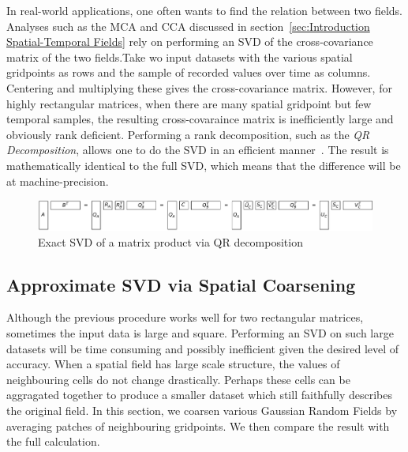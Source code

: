 \documentclass{acm_proc_article-sp}
\begin{document}
In real-world applications, one often wants to find the relation between two fields. Analyses such as the MCA and CCA discussed in section~\ref{sec:Introduction Spatial-Temporal Fields} rely on performing an SVD of the cross-covariance matrix of the two fields.Take wo input datasets with the various spatial gridpoints as rows and the sample of recorded values over time as columns. Centering and multiplying these gives the cross-covariance matrix. However, for highly rectangular matrices, when there are many spatial gridpoint but few temporal samples, the resulting cross-covaraince matrix is inefficiently large and obviously rank deficient. Performing a rank decomposition, such as the \textit{QR Decomposition}, allows one to do the SVD in an efficient manner~\cite{Chan1982, Tygert2017}. The result is mathematically identical to the full SVD, which means that the difference will be at machine-precision.

\begin{figure}[h]
\begin{center}
\includegraphics[width=\columnwidth]{Results/qrProductSVD.pdf}
\caption[Exact SVD via QR decomposition]{Exact SVD of a matrix product via QR decomposition}
\label{fig:qrProductSVD}
\end{center}
\end{figure}

\subsection{Approximate SVD via Spatial Coarsening}
\label{sec:Techniques Approximate SVD via Spatial Coarsening}

Although the previous procedure works well for two rectangular matrices, sometimes the input data is large and square. Performing an SVD on such large datasets will be time consuming and possibly inefficient given the desired level of accuracy. When a spatial field has large scale structure, the values of neighbouring cells do not change drastically. Perhaps these cells can be aggragated together to produce a smaller dataset which still faithfully describes the original field. In this section, we coarsen various Gaussian Random Fields by averaging patches of neighbouring gridpoints. We then compare the result with the full calculation.
\end{document}
